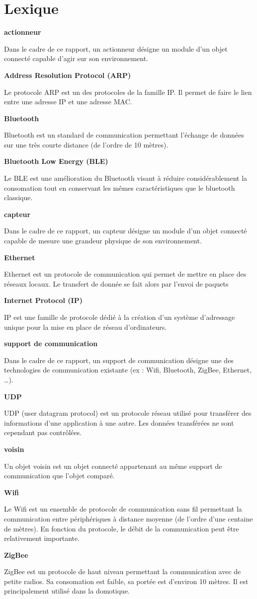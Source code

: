 \newcommand{\lexEntry}[2] {
	\noindent
	\parbox[t]{.3\textwidth}{\textbf{#1}}
	\hspace*{.03\textwidth}
	\parbox[t]{.65\textwidth}{#2}
	\hspace*{7pt}
}

\chapter*{Lexique}
	\lexEntry{actionneur} {
		Dans le cadre de ce rapport, un actionneur désigne un module d'un objet connecté capable
		d'agir sur son environnement.
	}
	
	\lexEntry{Address Resolution Protocol (ARP)} {
		Le protocole ARP est un des protocoles de la famille IP. Il permet de faire le lien entre une
		adresse IP et une adresse MAC.
	}

	\lexEntry{Bluetooth} {
		Bluetooth est un standard de communication permettant l'échange de données sur une très
		courte distance (de l'ordre de 10 mètres).
	}
	
	\lexEntry{Bluetooth Low Energy (BLE)} {
		Le BLE est une amélioration du Bluetooth visant à réduire considérablement la consomation
		tout en conservant les mêmes caractéristiques que le bluetooth classique.
	}
	
	\lexEntry{capteur} {
		Dans le cadre de ce rapport, un capteur désigne un module d'un objet connecté capable de
		mesure une grandeur physique de son environnement.
	}

	\lexEntry{Ethernet} {
		Ethernet est un protocole de communication qui permet de mettre en place
		des réseaux locaux. Le transfert de donnée se fait alors par l'envoi de
		paquets}
		
	\lexEntry{Internet Protocol (IP)} {
		IP est une famille de protocole dédié à la création d'un système d'adressage unique pour
		la mise en place de réseau d'ordinateurs.
	}
		
	\lexEntry{support de communication} {
		Dans le cadre de ce rapport, un support de communication désigne une des technologies de
		communication existante (ex : Wifi, Bluetooth, ZigBee, Ethernet, \dots).
	}
	
	\lexEntry{UDP} {
		UDP (user datagram protocol) est un protocole réseau utilisé pour
		transférer des informations d'une application à une autre. Les données
		transférées ne sont cependant pas contrôlées.
	}
	
	\lexEntry{voisin} {
		Un objet voisin est un objet connecté appartenant au même support de communication que
		l'objet comparé.
	}
		
	\lexEntry{Wifi} {
		Le Wifi est un ensemble de protocole de communication sans fil permettant la communication
		entre périphériques à distance moyenne (de l'ordre d'une centaine de mètres). En fonction
		du protocole, le débit de la communication peut être relativement importante.
	}
		
	\lexEntry{ZigBee} {
		ZigBee est un protocole de haut niveau permettant la communication avec de petite radios. 
		Sa consomation est faible, sa portée est d'environ 10 mètres. Il est principalement utilisé
		dans la domotique.
	}